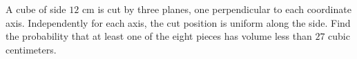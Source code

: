 A cube of side $12$ cm is cut by three planes, one perpendicular to each coordinate axis. Independently for each axis, the cut position is uniform along the side. Find the probability that at least one of the eight pieces has volume less than $27$ cubic centimeters.
